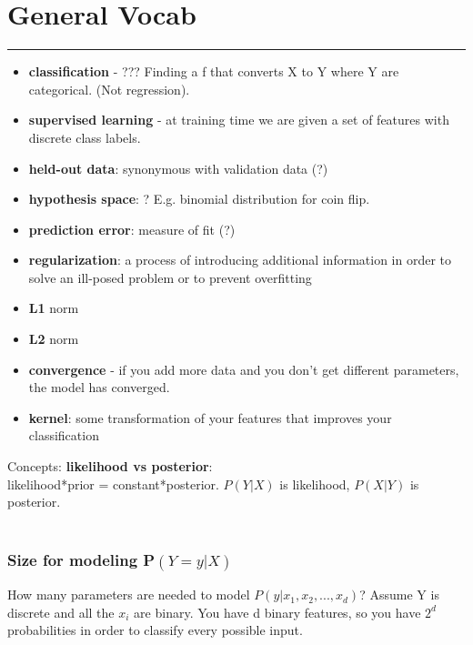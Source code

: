 \section{General Vocab}
\smallskip \hrule height 2pt \smallskip
 
 \begin{itemize}
 	\item \textbf{classification} - ??? Finding a f that converts X to Y where Y are categorical.  (Not regression).  
	\item \textbf{supervised learning} - at training time we are given a set of features with discrete class labels.  %
 	\item \textbf{held-out data}: synonymous with validation data (?)
	\item \textbf{hypothesis space}: ?  E.g. binomial distribution for coin flip.  	
 	\item \textbf{prediction error}: measure of fit (?) 
	\item \textbf{regularization}: a process of introducing additional information in order to solve an ill-posed problem or to prevent overfitting  %
	\item \textbf{L1} norm
	\item \textbf{L2} norm
	\item \textbf{convergence} - if you add more data and you don't get different parameters, the model has converged. 
	\item \textbf{kernel}: some transformation of your features that improves your classification %
 \end{itemize}
 
 Concepts:
\textbf{likelihood vs posterior}: \hfill \\

	likelihood*prior = constant*posterior.  $P(Y|X)$ is likelihood, $P(X|Y)$ is posterior.  
\hfill \\
\hfill \\

\subsubsection{Size for modeling P$(Y=y | X)$}
		How many parameters are needed to model $P(y | x_1, x_2, ..., x_d)$?  
		Assume Y is discrete and all the $x_i$ are binary.
		You have d binary features, so you have $2^d$ probabilities in order to classify every possible input.   %
		
